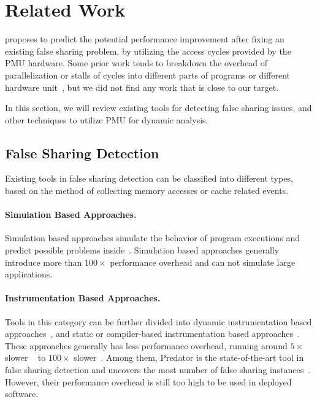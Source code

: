 \section{Related Work}

\label{sec:relatedwork}
\cheetah{} proposes to predict the potential performance improvement after fixing an existing false sharing problem, by utilizing the access cycles provided by the PMU hardware.  Some prior work tends to breakdown the overhead of parallelization or stalls of cycles into different parts of programs or different hardware unit~\cite{Crovella:1994:PPP:602770.602870, Azimi:2005:OPA:1088149.1088163}, but we did not find any work that is close to our target. 

In this section, we will review existing tools for detecting false sharing issues, and other techniques to utilize PMU for dynamic analysis.

\subsection{False Sharing Detection}

Existing tools in false sharing detection can be classified into different types, based on the method of collecting memory accesses or cache related events. 

\paragraph{Simulation Based Approaches.} Simulation based approaches simulate the behavior of program executions and predict possible problems inside~\cite{falseshare:simulator}. Simulation based approaches generally introduce more than $100\times$ performance overhead and can not simulate large applications. 

\paragraph{Instrumentation Based Approaches.} Tools in this category can be further divided into dynamic instrumentation based approaches~\cite{falseshare:binaryinstrumentation1, falseshare:binaryinstrumentation2, qinzhao}, and static or compiler-based instrumentation based approaches~\cite{Predator}.
These approaches generally has less performance overhead, running around $5\times$ slower ~\cite{qinzhao, Predator} to $100\times$ slower~\cite{falseshare:binaryinstrumentation1, falseshare:binaryinstrumentation2}. Among them, Predator is the state-of-the-art tool in false sharing detection and uncovers the most number of false sharing instances~\cite{Predator}. However, their performance overhead is still too high to be used in deployed software. 

